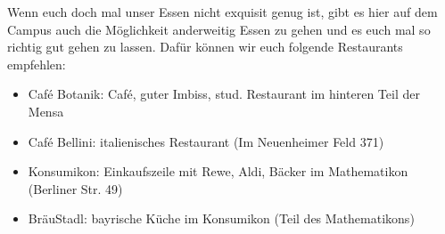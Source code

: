   Wenn euch doch mal unser Essen nicht exquisit genug ist, gibt es hier auf dem Campus auch die Möglichkeit
  anderweitig Essen zu gehen und es euch mal so richtig gut gehen zu lassen. Dafür können wir euch
  folgende Restaurants empfehlen:
  \begin{itemize}
  \item Café Botanik: Café, guter Imbiss, stud. Restaurant im hinteren Teil der Mensa
  \item Café Bellini: italienisches Restaurant (Im Neuenheimer Feld 371)
  \item Konsumikon: Einkaufszeile mit Rewe, Aldi, Bäcker im Mathematikon (Berliner Str. 49)
  \item BräuStadl: bayrische Küche im Konsumikon (Teil des Mathematikons)
  \end{itemize}
